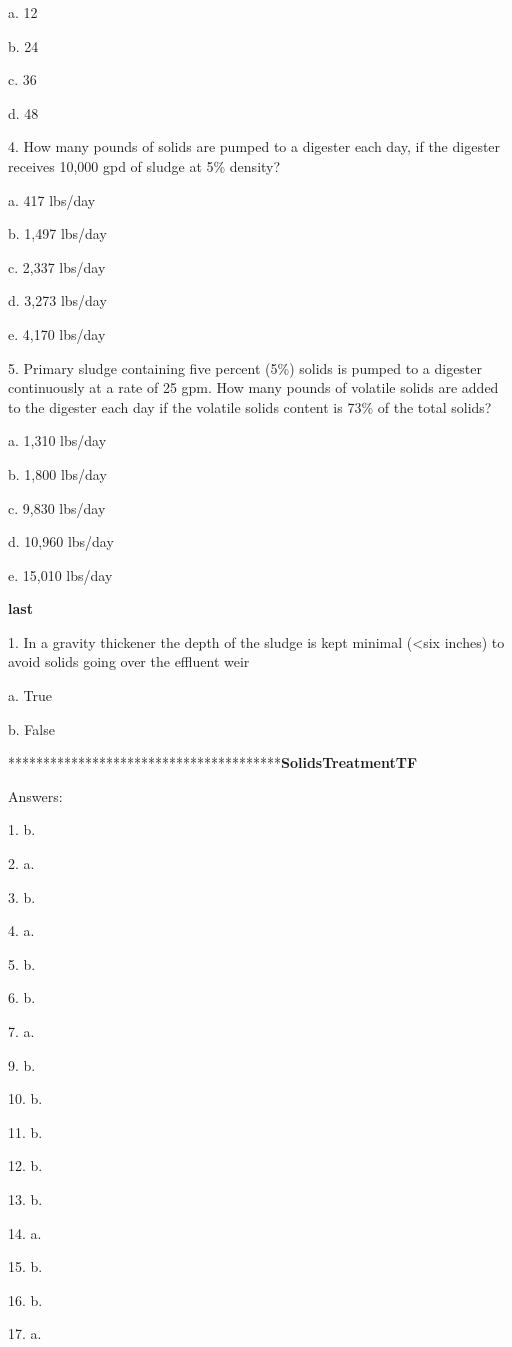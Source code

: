 \documentclass{article}
\begin{document}
a. 12 

b. 24 

c. 36 

d. 48 


4. How many pounds of solids are pumped to a digester each day, if the digester receives 10,000 gpd of sludge at 5\% density? 

a. 417 lbs/day 

b. 1,497 lbs/day 

c. 2,337 lbs/day 

d. 3,273 lbs/day 

e. 4,170 lbs/day 


5. Primary sludge containing five percent (5\%) solids is pumped to a digester continuously at a rate of 25 gpm. How many pounds of volatile solids are added to the digester each day if the volatile solids content is 73\% of the total solids? 

a. 1,310 lbs/day 

b. 1,800 lbs/day 

c. 9,830 lbs/day 

d. 10,960 lbs/day 

e. 15,010 lbs/day

\textbf{last}

1. In a gravity thickener the depth of the sludge is kept minimal (<six inches) to avoid solids going over the effluent weir 

a. True 

b. False 



***************************************\textbf{SolidsTreatmentTF}



Answers:

1.	b.  


2.	a.  


3.	b.  


4.	a.  


5.	b.  


6.	b.  


7.	a.  




9.	b.  


10.	b.  


11.	b.  


12.	b.  


13.	b.  


14.	a.  


15.	b.  


16.	b.  


17.	a.  
\end{document}
